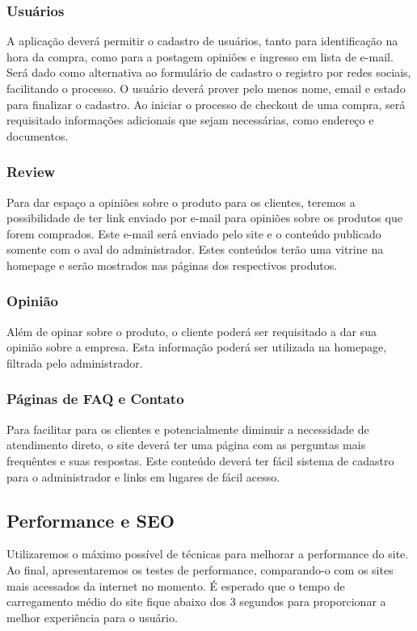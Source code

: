 \documentclass[
	12pt,				%
    oneside,			%
	a4paper,			%
	english,			%
	french,				%
	spanish,			%
	brazil				%
	]{abntex2}
\begin{document}
\subsubsection{Usuários}
A aplicação deverá permitir o cadastro de usuários, tanto para identificação na hora da compra, como para a postagem opiniôes e ingresso em lista de e-mail. Será dado como alternativa ao formulário de cadastro o registro por redes sociais, facilitando o processo. O usuário deverá prover pelo menos nome, email e estado para finalizar o cadastro. Ao iniciar o processo de checkout de uma compra, será requisitado informações adicionais que sejam necessárias, como endereço e documentos.

\subsubsection{Review}
Para dar espaço a opiniões sobre o produto para os clientes, teremos a possibilidade de ter link enviado por e-mail para opiniões sobre os produtos que forem comprados. Este e-mail será enviado pelo site e o conteúdo publicado somente com o aval do administrador. Estes conteúdos terão uma vitrine na homepage e serão mostrados nas páginas dos respectivos produtos.

\subsubsection{Opinião}
Além de opinar sobre o produto, o cliente poderá ser requisitado a dar sua opinião sobre a empresa. Esta informação poderá ser utilizada na homepage, filtrada pelo administrador.

\subsubsection{Páginas de FAQ e Contato}
Para facilitar para os clientes e potencialmente diminuir a necessidade de atendimento direto, o site deverá ter uma página com as perguntas mais frequêntes e suas respostas. Este conteúdo deverá ter fácil sistema de cadastro para o administrador e links em lugares de fácil acesso.

\subsection{Performance e SEO}

Utilizaremos o máximo possível de técnicas para melhorar a performance do site. Ao final, apresentaremos os testes de performance, comparando-o com os sites mais acessados da internet no momento. É esperado que o tempo de carregamento médio do site fique abaixo dos 3 segundos para proporcionar a melhor experiência para o usuário.
\end{document}
